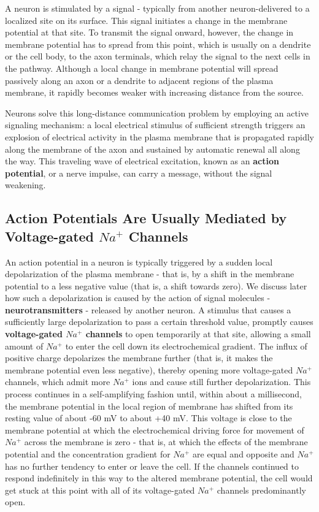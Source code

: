 A neuron is stimulated by a signal - typically from another neuron-delivered
to a localized site on its surface. This signal initiates a change in
the membrane potential at that site. To transmit the signal onward, however,
the change in membrane potential has to spread from this point,
which is usually on a dendrite or the cell body, to the axon terminals,
which relay the signal to the next cells in the pathway. Although a local
change in membrane potential will spread passively along an axon or a
dendrite to adjacent regions of the plasma membrane, it rapidly becomes
weaker with increasing distance from the source.

Neurons solve this long-distance communication problem by employing
an active signaling mechanism: a local electrical stimulus of sufficient
strength triggers an explosion of electrical activity in the plasma membrane
that is propagated rapidly along the membrane of the axon and
sustained by automatic renewal all along the way. This traveling wave of
electrical excitation, known as an \textbf{action potential}, or a nerve impulse,
can carry a message, without the signal weakening.

\subsection{Action Potentials Are Usually Mediated by Voltage-gated $Na^{+}$ Channels}

An action potential in a neuron is typically triggered by a sudden local
depolarization of the plasma membrane - that is, by a shift in the membrane
potential to a less negative value (that is, a shift towards zero). We
discuss later how such a depolarization is caused by the action of signal
molecules - \textbf{neurotransmitters} - released by another neuron. A stimulus
that causes a sufficiently large depolarization to pass a certain threshold
value, promptly causes \textbf{voltage-gated $Na^{+}$ channels} to open temporarily
at that site, allowing a small amount of $Na^{+}$ to enter the cell down
its electrochemical gradient. The influx of positive charge depolarizes
the membrane further (that is, it makes the membrane potential even
less negative), thereby opening more voltage-gated $Na^{+}$ channels, which
admit more $Na^{+}$ ions and cause still further depolarization. This process
continues in a self-amplifying fashion until, within about a millisecond,
the membrane potential in the local region of membrane has shifted from
its resting value of about -60 mV to about +40 mV. This
voltage is close to the membrane potential at which the electrochemical
driving force for movement of $Na^{+}$ across the membrane is zero - that
is, at which the effects of the membrane potential and the concentration
gradient for $Na^{+}$ are equal and opposite and $Na^{+}$ has no further tendency
to enter or leave the cell. If the channels continued to respond indefinitely
in this way to the altered membrane potential, the cell would get stuck
at this point with all of its voltage-gated $Na^{+}$ channels predominantly
open.


